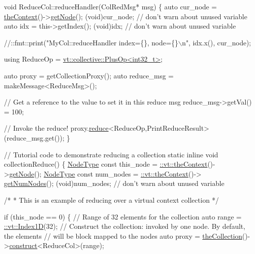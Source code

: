 \begin{DoxyCodeInclude}
\textcolor{keywordtype}{void} ReduceCol::reduceHandler(ColRedMsg* msg) \{
  \textcolor{keyword}{auto} cur\_node = \hyperlink{namespacevt_a26551fe0e6e6a1371111df5b12c7e92c}{theContext}()->\hyperlink{structvt_1_1ctx_1_1_context_a0d52c263ce8516546a67443d9a86fa5f}{getNode}();
  (void)cur\_node;  \textcolor{comment}{// don't warn about unused variable}
  \textcolor{keyword}{auto} idx = this->getIndex();
  (void)idx;  \textcolor{comment}{// don't warn about unused variable}

  \textcolor{comment}{//::fmt::print("MyCol::reduceHandler index=\{\}, node=\{\}\(\backslash\)n", idx.x(), cur\_node);}

  \textcolor{keyword}{using} ReduceOp = \hyperlink{structvt_1_1collective_1_1reduce_1_1operators_1_1_plus_op}{vt::collective::PlusOp<int32\_t>};

  \textcolor{keyword}{auto} proxy = getCollectionProxy();
  \textcolor{keyword}{auto} reduce\_msg = makeMessage<ReduceMsg>();

  \textcolor{comment}{// Get a reference to the value to set it in this reduce msg}
  reduce\_msg->getVal() = 100;

  \textcolor{comment}{// Invoke the reduce!}
  proxy.\hyperlink{structvt_1_1objgroup_1_1proxy_1_1_proxy_a61273d407174fb496b4aed10ec6650bd}{reduce}<ReduceOp,PrintReduceResult>(reduce\_msg.get());
\}

\textcolor{comment}{// Tutorial code to demonstrate reducing a collection}
\textcolor{keyword}{static} \textcolor{keyword}{inline} \textcolor{keywordtype}{void} collectionReduce() \{
  \hyperlink{namespacevt_a866da9d0efc19c0a1ce79e9e492f47e2}{NodeType} \textcolor{keyword}{const} this\_node = \hyperlink{namespacevt_a26551fe0e6e6a1371111df5b12c7e92c}{::vt::theContext}()->\hyperlink{structvt_1_1ctx_1_1_context_a0d52c263ce8516546a67443d9a86fa5f}{getNode}();
  \hyperlink{namespacevt_a866da9d0efc19c0a1ce79e9e492f47e2}{NodeType} \textcolor{keyword}{const} num\_nodes = \hyperlink{namespacevt_a26551fe0e6e6a1371111df5b12c7e92c}{::vt::theContext}()->
      \hyperlink{structvt_1_1ctx_1_1_context_a7f41071aadf6d5fa9e1b6c703c5ff19d}{getNumNodes}();
  (void)num\_nodes;  \textcolor{comment}{// don't warn about unused variable}

  \textcolor{comment}{/*}
\textcolor{comment}{   * This is an example of reducing over a virtual context collection}
\textcolor{comment}{   */}

  \textcolor{keywordflow}{if} (this\_node == 0) \{
    \textcolor{comment}{// Range of 32 elements for the collection}
    \textcolor{keyword}{auto} range = \hyperlink{namespacevt_1_1index_a091a4f5a7a2c993d9727eaa60cf67d81}{::vt::Index1D}(32);
    \textcolor{comment}{// Construct the collection: invoked by one node. By default, the elements}
    \textcolor{comment}{// will be block mapped to the nodes}
    \textcolor{keyword}{auto} proxy = \hyperlink{namespacevt_a1c45ce63bfd2c327ff7d76a319a371d8}{theCollection}()->\hyperlink{structvt_1_1vrt_1_1collection_1_1_collection_manager_a4de84e9efd7a3948e3c20be549441cfd}{construct}<ReduceCol>(range);


\end{DoxyCodeInclude}
